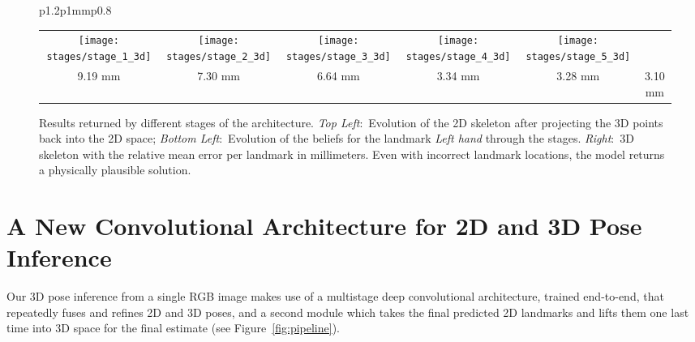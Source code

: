 \documentclass[10pt,twocolumn,letterpaper]{article}
\begin{document}
\begin{figure*}
\begin{tabular}{p{}p{1mm}p{}}
\begin{center}
\begin{tabular}{cccccc}
\texttt{[image: stages/stage\_1\_3d]}         & 
\texttt{[image: stages/stage\_2\_3d]}         & 
\texttt{[image: stages/stage\_3\_3d]}         & 
\texttt{[image: stages/stage\_4\_3d]}         & 
\texttt{[image: stages/stage\_5\_3d]}                                                                                                                       \\
  \small  9.19 mm                                                & \small  7.30 mm & \small  6.64 mm & \small  3.34 mm & \small  3.28 mm & \small  3.10 mm
\end{tabular}
\end{center}
\end{tabular}
\vspace{-5mm}
\caption{\small Results returned by different stages of the
  architecture. \textit{Top Left}:~Evolution of the 2D skeleton after
  projecting the 3D points back into the 2D space;
  \textit{Bottom Left}:~Evolution of the beliefs for the landmark {\em Left
  hand} through the stages. \textit{Right}:~3D skeleton
  with the relative mean error per landmark in
  millimeters. Even with incorrect
  landmark locations, the model returns a physically
  plausible solution.\label{fig:manifold_3D_corrections_stages}\vspace{-5mm}}
\end{figure*}

\section{A New Convolutional Architecture for 2D and 3D Pose Inference}
\label{sec:pose-inference}
Our 3D pose inference from a single RGB image makes use of a
multistage deep convolutional architecture, trained end-to-end, that
repeatedly fuses and refines 2D and 3D poses, and a second module
which takes the final predicted 2D landmarks and lifts them one last
time into 3D space for the  final estimate (see
Figure~\ref{fig:pipeline}).
\end{document}

